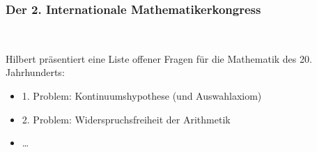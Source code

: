 \documentclass[aspectratio=1610,onlymath]{beamer}
\begin{document}
\begin{frame}\frametitle{Der 2. Internationale Mathematikerkongress}\label{frame_hilbert}

\begin{minipage}{7cm}
\end{minipage}
\begin{minipage}{2.5cm}
~\hspace{8mm}
\end{minipage}
\medskip\pause

Hilbert präsentiert eine Liste offener Fragen für die Mathematik des 20. Jahrhunderts:
\begin{itemize}
	\item 1. Problem: Kontinuumshypothese (und Auswahlaxiom)
	\item 2. Problem: Widerspruchsfreiheit der Arithmetik
	\item \ldots
\end{itemize}


\end{frame}
\end{document}
